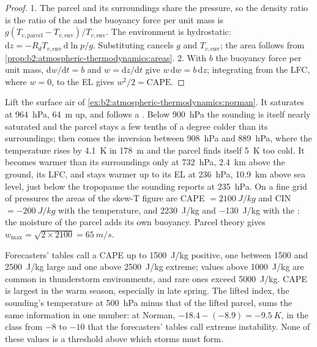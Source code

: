 \begin{proof}
1. The parcel and its surroundings share the pressure, so the density ratio is the ratio of the
 and the buoyancy force per unit mass is
$g(T_{v,\text{parcel}} - T_{v,\text{env}})/T_{v,\text{env}}$. The environment is hydrostatic:
$\mathrm{d}z = -R_dT_{v,\text{env}}\,\mathrm{d}\ln p/g$. Substituting cancels $g$ and
$T_{v,\text{env}}$; the area follows from \cref{prop:b2:atmospheric-thermodynamics:areas}.
2. With $b$ the buoyancy force per unit mass, $\mathrm{d}w/\mathrm{d}t = b$ and $w = \mathrm{d}z/
\mathrm{d}t$ give $w\,\mathrm{d}w = b\,\mathrm{d}z$; integrating from the LFC, where $w = 0$, to
the EL gives $w^2/2 = \text{CAPE}$.
\end{proof}

\begin{example}\label{ex:b2:atmospheric-thermodynamics:cape}
Lift the surface air of \cref{ex:b2:atmospheric-thermodynamics:norman}. It saturates at
\qty{964}{hPa}, \qty{64}{m} up, and follows a . Below \qty{900}{hPa} the sounding is
itself nearly saturated and the parcel stays a few tenths of a degree colder than its
surroundings; then comes the inversion between \qty{908}{hPa} and \qty{889}{hPa}, where the
temperature rises by \qty{4.1}{K} in \qty{178}{m} and the parcel finds itself \qty{5}{K} too
cold. It becomes warmer than its surroundings only at \qty{732}{hPa}, \qty{2.4}{km} above the
ground, its LFC, and stays warmer up to its EL at \qty{236}{hPa}, \qty{10.9}{km} above sea level,
just below the tropopause the sounding reports at \qty{235}{hPa}. On a fine grid of pressures the
areas of the skew-T figure are CAPE $= \qty{2100}{J/kg}$ and CIN $= \qty{-200}{J/kg}$ with the
temperature, and \qty{2230}{J/kg} and \qty{-130}{J/kg} with the : the moisture
of the parcel adds its own buoyancy. Parcel theory gives $w_{\max} = \sqrt{2 \times 2100} =
\qty{65}{m/s}$.
\end{example}

Forecasters' tables call a CAPE up to \qty{1500}{J/kg} positive, one between 1500 and
\qty{2500}{J/kg} large and one above \qty{2500}{J/kg} extreme; values above \qty{1000}{J/kg} are common in thunderstorm environments,
and rare ones exceed \qty{5000}{J/kg}. CAPE is largest in the warm season, especially in late
spring. The lifted index, the sounding's temperature at \qty{500}{hPa} minus that of the lifted
parcel, sums the same information in one number: at Norman, $-18.4 - (-8.9) = \qty{-9.5}{K}$,
in the class from $-8$ to $-10$ that the forecasters' tables call extreme instability. None of
these values is a threshold above which storms must form.

